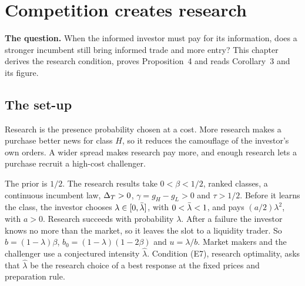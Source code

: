 \chapter{Competition creates research}\label{ch:research}

\begin{chapterplan}
\textbf{The question.} When the informed investor must pay for its information, does a stronger incumbent still bring
informed trade and more entry? This chapter derives the research condition, proves Proposition~4 and reads
Corollary~3 and its figure.
\end{chapterplan}

\section{The set-up}\label{sec:research-setup}

\begin{keyidea}
Research is the presence probability chosen at a cost. More research makes a purchase better news for class \(H\), so
it reduces the camouflage of the investor's own orders. A wider spread makes research pay more, and enough research
lets a purchase recruit a high-cost challenger.
\end{keyidea}

The prior is \(1/2\). The research results take \(0<\beta<1/2\), ranked classes, a continuous incumbent law, \(\Delta_T>0\),
\(\gamma=g_H-g_L>0\) and \(\tau>1/2\). Before it learns the class, the investor chooses \(\lambda\in[0,\bar\lambda]\), with
\(0<\bar\lambda<1\), and pays \((a/2)\lambda^2\), with \(a>0\). Research succeeds with probability \(\lambda\). After a failure the investor knows no more than the market, so it leaves
the slot to a liquidity trader. So \(b=(1-\lambda)\beta\), \(b_0=(1-\lambda)(1-2\beta)\) and \(u=\lambda/b\). Market makers and the challenger
use a conjectured intensity \(\hat\lambda\). Condition (E7), research optimality, asks that \(\hat\lambda\) be the
research choice of a best response at the fixed prices and preparation rule.

